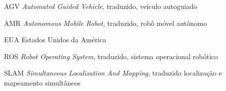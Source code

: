 
\begin{siglas}
    \item[AGV] \textit{Automated Guided Vehicle}, traduzido, veículo autoguiado
    \item[AMR] \textit{Autonomous Mobile Robot}, traduzido, robô móvel autônomo
    \item[EUA] Estados Unidos da América
    \item[ROS] \textit{Robot Operating System}, traduzido, sistema operacional robótico
    \item[SLAM] \textit{Simultaneous Localization And Mapping}, traduzido localização e mapeamento simultâneos
    
\end{siglas}
    